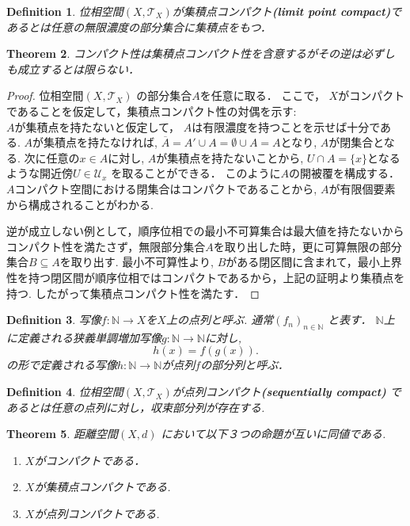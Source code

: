 \documentclass[dvipdfmx]{jbook}
\newcommand{\cl}[1]{\overline{ #1}  }
\newtheorem{theorem}{Theorem}[section]
\newtheorem{definition}[theorem]{Definition}
\theoremstyle{remark}
\theoremstyle{plain}
\begin{document}
\begin{definition}
	位相空間$\left( X , \mathcal{T}_{X} \right)$が集積点コンパクト\textbf{(limit point compact)}であるとは任意の無限濃度の部分集合に集積点をもつ．
\end{definition}

\begin{theorem}
	コンパクト性は集積点コンパクト性を含意するがその逆は必ずしも成立するとは限らない．
\end{theorem}

\begin{proof}
	位相空間$\left( X , \mathcal{T}_{X} \right)$ の部分集合$A$を任意に取る．
	ここで， $X$がコンパクトであることを仮定して，集積点コンパクト性の対偶を示す: \\
	 $A$が集積点を持たないと仮定して， $A$は有限濃度を持つことを示せば十分である.
	 $A$が集積点を持たなければ,  $\cl{A} = A ' \cup  A = \emptyset \cup A =A$となり, $A$が閉集合となる. 次に任意の$x \in A$に対し,  $A$が集積点を持たないことから,  $U \cap A = \{x\} $となるような開近傍$U \in \mathcal{U}_x$ を取ることができる．
	 このように$A$の開被覆を構成する． $A$コンパクト空間における閉集合はコンパクトであることから,  $A$が有限個要素から構成されることがわかる.

	 逆が成立しない例として，順序位相での最小不可算集合は最大値を持たないからコンパクト性を満たさず，無限部分集合$A$を取り出した時，更に可算無限の部分集合$B \subseteq A$を取り出す. 最小不可算性より, $B$がある閉区間に含まれて，最小上界性を持つ閉区間が順序位相ではコンパクトであるから，上記の証明より集積点を持つ. したがって集積点コンパクト性を満たす．
\end{proof}

\begin{definition}
	 写像$f: \mathbb{N} \to X$を$X$上の点列と呼ぶ. 
	 通常$(f_n)_{n \in \mathbb{N}}$ と表す．
	 $\mathbb{N}$上に定義される狭義単調増加写像$g: \mathbb{N} \to  \mathbb{N}$に対し, 
	 \[
	 h(x) = f(g(x))
	 .\] 
	 の形で定義される写像$h: \mathbb{N} \to \mathbb{N}$が点列$f$の部分列と呼ぶ．
\end{definition}

\begin{definition}
	位相空間$\left( X , \mathcal{T}_{X} \right)$が点列コンパクト\textbf{(sequentially compact)}
	であるとは任意の点列に対し，収束部分列が存在する.
\end{definition}

\begin{theorem}
	距離空間$\left( X ,d \right)$ において以下３つの命題が互いに同値である.
	\begin{enumerate}
		\item $X$がコンパクトである．
		\item  $X$が集積点コンパクトである.
		\item $X$が点列コンパクトである.
	\end{enumerate}
\end{theorem}
\end{document}
